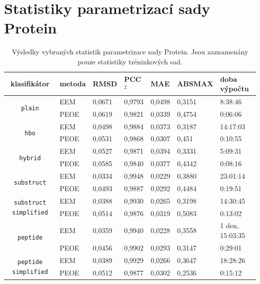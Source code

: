 
\chapter{Statistiky parametrizací sady Protein}
\label{proteinstat}
\begin{table}[h]
    \renewcommand{\arraystretch}{1.4}
    \centering
    \begin{tabular}{c|l|l|l|l|l|l}
         \textbf{klasifikátor} &  \textbf{metoda} & \textbf{RMSD} & \textbf{PCC$^2$} & \textbf{MAE} & \textbf{ABSMAX} & \textbf{doba výpočtu}\\
         \hline
         \multirow{2}{6em}{\texttt{plain}} & EEM & 0,0671 & 0,9793 & 0,0498 & 0,3151 & 8:38:46  \\
         & PEOE & 0,0619 & 0,9821 & 0,0339 & 0,4754 & 0:06:06 \\
         \hline
         \multirow{2}{6em}{\texttt{hbo}} & EEM & 0,0498 & 0,9884 & 0,0373 & 0,3187 & 14:17:03 \\
         & PEOE & 0,0531 & 0,9868 & 0,0307 & 0,451 & 0:10:55 \\
         \hline
         \multirow{2}{6em}{\texttt{hybrid}} & EEM & 0,0527 & 0,9871 & 0,0394 & 0,3331 & 5:09:31 \\
         & PEOE & 0,0585 & 0,9840 & 0,0377 & 0,4342 & 0:08:16 \\
         \hline
         \multirow{2}{6em}{\texttt{substruct}} & EEM & 0,0334 & 0,9948 & 0,0229 & 0,3880 & 23:01:14 \\
         & PEOE & 0,0493 & 0,9887 & 0,0292 & 0,4484 & 0:19:51 \\
         \hline
         \multirow{2}{6em}{\texttt{substruct simplified}} & EEM & 0,0388 & 0,9930 & 0,0265 & 0,3198 & 14:30:45 \\
         & PEOE & 0,0514 & 0,9876 & 0,0319 & 0,5083 & 0:13:02 \\
         \hline
         \multirow{2}{6em}{\texttt{peptide}} & EEM & 0,0359 & 0,9940 & 0,0228 & 0,3558 & 1 den, 15:03:35 \\
         & PEOE & 0,0456 & 0,9902 & 0,0293 & 0,3147 & 0:29:01 \\
         \hline
         \multirow{2}{6em}{\texttt{peptide simplified}} & EEM & 0,0389 & 0,9929 & 0,0266 & 0,3647 & 18:28:26 \\
         & PEOE & 0,0512 & 0,9877 & 0,0302 & 0,2536 & 0:15:12
    \end{tabular}
    \caption{Výsledky vybraných statistik parametrizace sady Protein. Jsou zaznamenány pouze statistiky tréninkových sad.}
    \label{statistics_PDB}
\end{table}

